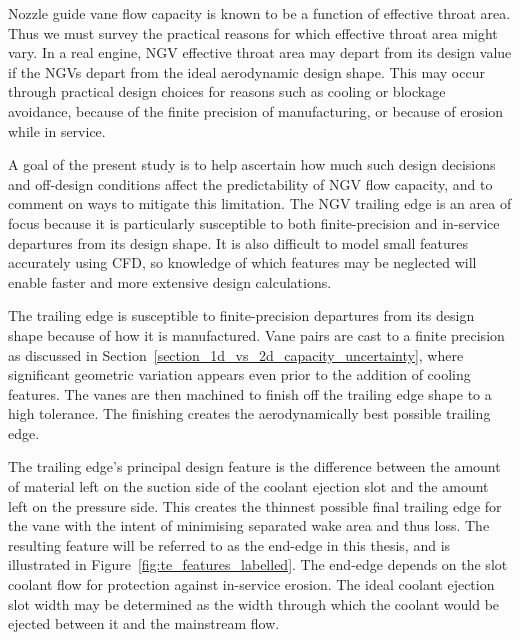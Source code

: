 \documentclass[a4paper, 11pt, oneside]{report}
\begin{document}
Nozzle guide vane flow capacity is known to be a function of effective throat area. Thus we must survey the practical reasons for which effective throat area might vary. In a real engine, NGV effective throat area may depart from its design value if the NGVs depart from the ideal aerodynamic design shape. This may occur through practical design choices for reasons such as cooling or blockage avoidance, because of the finite precision of manufacturing, or because of erosion while in service. 

A goal of the present study is to help ascertain how much such design decisions and off-design conditions affect the predictability of NGV flow capacity, and to comment on ways to mitigate this limitation. The NGV trailing edge is an area of focus because it is particularly susceptible to both finite-precision and in-service departures from its design shape. It is also difficult to model small features accurately using CFD, so knowledge of which features may be neglected will enable faster and more extensive design calculations.

The trailing edge is susceptible to finite-precision departures from its design shape because of how it is manufactured. Vane pairs are cast to a finite precision as discussed in Section~\ref{section_1d_vs_2d_capacity_uncertainty}, where significant geometric variation appears even prior to the addition of cooling features. The vanes are then machined to finish off the trailing edge shape to a high tolerance. The finishing creates the aerodynamically best possible trailing edge. 

The trailing edge's principal design feature is the difference between the amount of material left on the suction side of the coolant ejection slot and the amount left on the pressure side. This creates the thinnest possible final trailing edge for the vane with the intent of minimising separated wake area and thus loss. The resulting feature will be referred to as the end-edge in this thesis, and is illustrated in Figure~\ref{fig:te_features_labelled}. The end-edge depends on the slot coolant flow for protection against in-service erosion. The ideal coolant ejection slot width may be determined as the width through which the coolant would be ejected between it and the mainstream flow.
\end{document}
